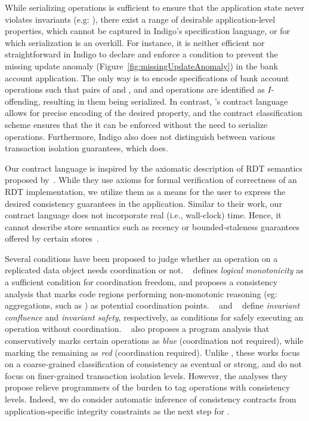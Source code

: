 While serializing operations is sufficient to ensure that the application state
never violates invariants (e.g: ), there exist a range of
desirable application-level properties, which cannot be captured in Indigo's
specification language, or for which serialization is an overkill. For instance,
it is neither efficient nor straightforward in Indigo to declare and enforce a
condition to prevent the missing update anomaly
(Figure~\ref{fig:missingUpdateAnomaly}) in the bank account application. The
only way is to encode specifications of bank account operations such that pairs
of  and , and  and 
operations are identified as $I$-offending, resulting in them being serialized.
In contrast, \name's contract language allows for precise encoding of the
desired property, and the contract classification scheme ensures that the it can
be enforced without the need to serialize operations.  Furthermore, Indigo also
does not distinguish between various transaction isolation guarantees, which
\name does.

Our contract language is inspired by the axiomatic description of RDT semantics
proposed by~\cite{Burckhardt2014}. While they use axioms for formal
verification of correctness of an RDT implementation, we utilize them as a
means for the user to express the desired consistency guarantees in the
application. Similar to their work, our contract language does not incorporate
real (i.e., wall-clock) time. Hence, it cannot describe store semantics such as
recency or bounded-staleness guarantees offered by certain
stores~\cite{Pileus}.

Several conditions have been proposed to judge whether an operation on a
replicated data object needs coordination or not. ~\cite{Calm} defines
\emph{logical monotonicity} as a sufficient condition for coordination freedom,
and proposes a consistency analysis that marks code regions performing
non-monotonic reasoning (eg: aggregations, such as ) as potential
coordination points. ~\cite{IConfluence} and ~\cite{Sieve} define
\emph{invariant confluence} and \emph{invariant safety}, respectively, as
conditions for safely executing an operation without coordination.
~\cite{Sieve} also proposes a program analysis that conservatively marks
certain operations as \emph{blue} (coordination not required), while marking
the remaining as \emph{red} (coordination required). Unlike \name, these works
focus on a coarse-grained classification of consistency as eventual or strong,
and do not focus on finer-grained transaction isolation levels. However, the
analyses they propose relieve programmers of the burden to tag operations with
consistency levels. Indeed, we do consider automatic inference of consistency
contracts from application-specific integrity constraints as the next step for
\name.
